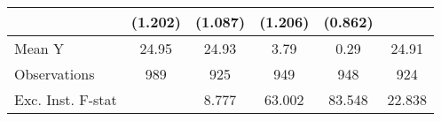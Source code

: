 {\begin{tabular}{l*{5}{c}}
            &     (1.202)         &     (1.087)         &     (1.206)         &     (0.862)         &                     \\
\midrule
Mean Y      &       24.95         &       24.93         &        3.79         &        0.29         &       24.91         \\
Observations&         989         &         925         &         949         &         948         &         924         \\
Exc. Inst. F-stat&                     &       8.777         &      63.002         &      83.548         &      22.838         \\
\bottomrule
\end{tabular}
}
